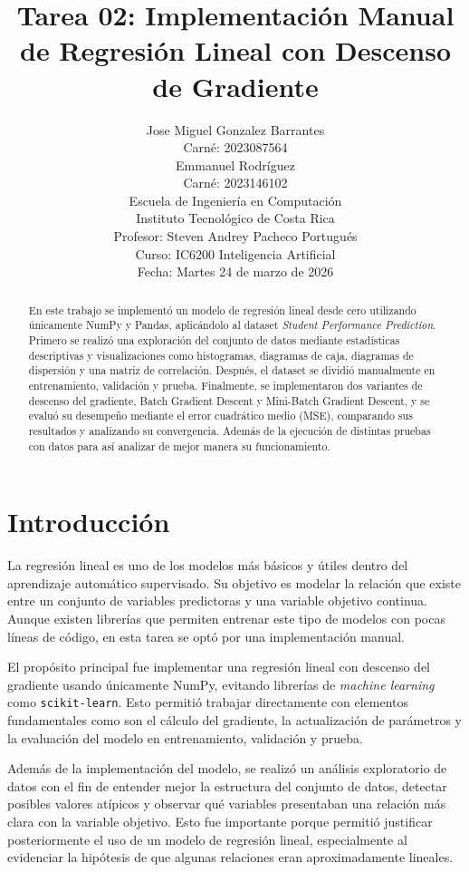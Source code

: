 \documentclass[conference]{IEEEtran}
\title{Tarea 02: Implementación Manual de Regresión Lineal con Descenso de Gradiente}
\author{
Jose Miguel Gonzalez Barrantes\\
Carné: 2023087564\\
Emmanuel Rodríguez\\
Carné: 2023146102\\
Escuela de Ingeniería en Computación\\
Instituto Tecnológico de Costa Rica\\
Profesor: Steven Andrey Pacheco Portugués\\
Curso: IC6200 Inteligencia Artificial\\
Fecha: Martes 24 de marzo de 2026
}
\begin{document}
\maketitle

\begin{abstract}
En este trabajo se implementó un modelo de regresión lineal desde cero utilizando únicamente NumPy y Pandas, aplicándolo al dataset \textit{Student Performance Prediction}. Primero se realizó una exploración del conjunto de datos mediante estadísticas descriptivas y visualizaciones como histogramas, diagramas de caja, diagramas de dispersión y una matriz de correlación. Después, el dataset se dividió manualmente en entrenamiento, validación y prueba. Finalmente, se implementaron dos variantes de descenso del gradiente, Batch Gradient Descent y Mini-Batch Gradient Descent, y se evaluó su desempeño mediante el error cuadrático medio (MSE), comparando sus resultados y analizando su convergencia. Además de la ejecución de distintas pruebas con datos para así analizar de mejor manera su funcionamiento.
\end{abstract}

\section{Introducción}

La regresión lineal es uno de los modelos más básicos y útiles dentro del aprendizaje automático supervisado. Su objetivo es modelar la relación que existe entre un conjunto de variables predictoras y una variable objetivo continua. Aunque existen librerías que permiten entrenar este tipo de modelos con pocas líneas de código, en esta tarea se optó por una implementación manual.

El propósito principal fue implementar una regresión lineal con descenso del gradiente usando únicamente NumPy, evitando librerías de \textit{machine learning} como \texttt{scikit-learn}. Esto permitió trabajar directamente con elementos fundamentales como son el cálculo del gradiente, la actualización de parámetros y la evaluación del modelo en entrenamiento, validación y prueba.

Además de la implementación del modelo, se realizó un análisis exploratorio de datos con el fin de entender mejor la estructura del conjunto de datos, detectar posibles valores atípicos y observar qué variables presentaban una relación más clara con la variable objetivo. Esto fue importante porque permitió justificar posteriormente el uso de un modelo de regresión lineal, especialmente al evidenciar la hipótesis de que algunas relaciones eran aproximadamente lineales.
\end{document}
